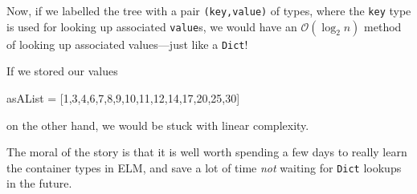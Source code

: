\documentclass[12pt]{amsbook}
\begin{document}
Now, if we labelled the tree with a pair \texttt{(key,value)} of types, where the \texttt{key} type is used for looking up associated \texttt{value}s, we would have an $\mathcal{O}(\log_2 n)$ method of looking up associated values---just like a \texttt{Dict}!

If we stored our values
\begin{code}
asAList = [1,3,4,6,7,8,9,10,11,12,14,17,20,25,30]
\end{code}
on the other hand,
we would be stuck with linear complexity.

\medskip
The moral of the story is that it is well worth spending a few days to really learn the container types in ELM, 
and save a lot of time \emph{not} waiting for \texttt{Dict} lookups in the future.

%
%
%
\end{document}
